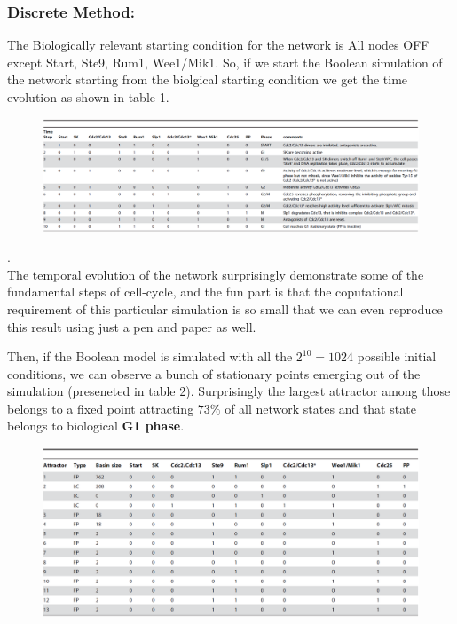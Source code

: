 \documentclass{article}
\begin{document}
\subsubsection*{Discrete Method:}
The Biologically relevant starting condition for the network is All nodes OFF 
except Start, Ste9, Rum1, Wee1/Mik1. So, if we start the Boolean simulation of 
the network starting from the biolgical starting condition we get the time evolution
as shown in table 1.
\begin{figure}[H]
  \centering
  \includegraphics[width=\linewidth, scale=0.5]{bio_start_state_evo.png} \\
\end{figure}
.\\
The temporal evolution of the network surprisingly demonstrate some of the 
fundamental steps of cell-cycle, and the fun part is that the coputational 
requirement of this particular simulation is so small that we can even 
reproduce this result using just a pen and paper as well.

Then, if the Boolean model is simulated with all the $2^{10} = 1024$ possible 
initial conditions, we can observe a bunch of stationary points emerging out 
of the simulation (preseneted in table 2). Surprisingly the largest attractor 
among those belongs to a fixed point attracting $73\%$ of all network states 
and that state belongs to biological \textbf{G1 phase}.
\begin{figure}[H]
  \centering
  \includegraphics[width=\linewidth, scale=0.5]{fixed_point_bool.png} \\
\end{figure}
\end{document}
